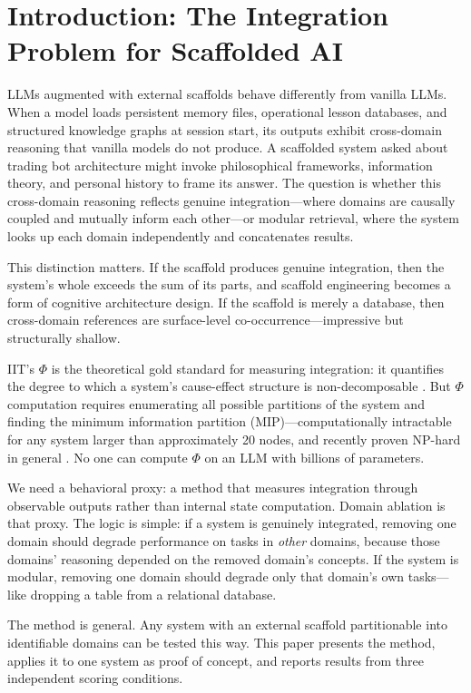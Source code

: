 \documentclass[12pt,letterpaper]{article}
\begin{document}
\section{Introduction: The Integration Problem for Scaffolded AI}
\label{sec:intro}

LLMs augmented with external scaffolds behave differently from vanilla LLMs. When a model loads persistent memory files, operational lesson databases, and structured knowledge graphs at session start, its outputs exhibit cross-domain reasoning that vanilla models do not produce. A scaffolded system asked about trading bot architecture might invoke philosophical frameworks, information theory, and personal history to frame its answer. The question is whether this cross-domain reasoning reflects genuine integration---where domains are causally coupled and mutually inform each other---or modular retrieval, where the system looks up each domain independently and concatenates results.

This distinction matters. If the scaffold produces genuine integration, then the system's whole exceeds the sum of its parts, and scaffold engineering becomes a form of cognitive architecture design. If the scaffold is merely a database, then cross-domain references are surface-level co-occurrence---impressive but structurally shallow.

IIT's $\Phi$ is the theoretical gold standard for measuring integration: it quantifies the degree to which a system's cause-effect structure is non-decomposable \citep{tononi2023iit4}. But $\Phi$ computation requires enumerating all possible partitions of the system and finding the minimum information partition (MIP)---computationally intractable for any system larger than approximately 20 nodes, and recently proven NP-hard in general \citep{krohn2025nphard}. No one can compute $\Phi$ on an LLM with billions of parameters.

We need a behavioral proxy: a method that measures integration through observable outputs rather than internal state computation. Domain ablation is that proxy. The logic is simple: if a system is genuinely integrated, removing one domain should degrade performance on tasks in \emph{other} domains, because those domains' reasoning depended on the removed domain's concepts. If the system is modular, removing one domain should degrade only that domain's own tasks---like dropping a table from a relational database.

The method is general. Any system with an external scaffold partitionable into identifiable domains can be tested this way. This paper presents the method, applies it to one system as proof of concept, and reports results from three independent scoring conditions.
\end{document}
